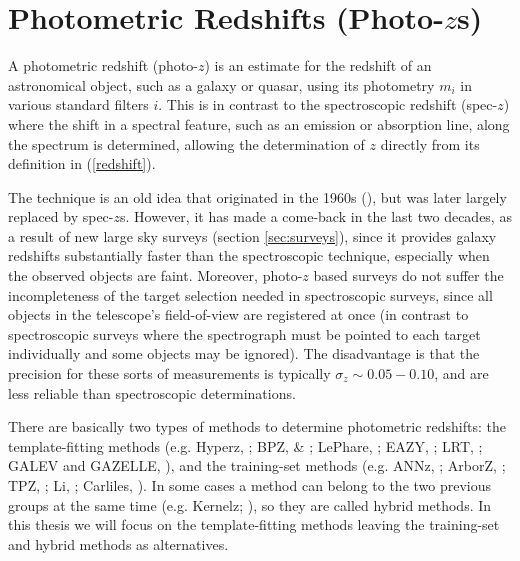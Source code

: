 \section{Photometric Redshifts (Photo-$z$s)}
\label{sec:theo_photoz}

A photometric redshift (photo-$z$) is an estimate for the redshift of an astronomical object, such as a galaxy or quasar, using its photometry $m_i$ in various standard filters $i$. This is in contrast to the spectroscopic redshift (spec-$z$) where the shift in a spectral feature, such as an emission or absorption line, along the spectrum is determined, allowing the determination of $z$ directly from its definition in (\ref{redshift}). 

The technique is an old idea that originated in the 1960s (\citet{Baum1962, Puschell1982, Koo1985, Loh1986, Connolly1995}), but was later largely replaced by spec-$z$s. However, it has made a come-back in the last two decades, as a result of new large sky surveys (section \ref{sec:surveys}), since it provides galaxy redshifts substantially faster than the spectroscopic technique, especially when the observed objects are faint. Moreover, photo-$z$ based surveys do not suffer the incompleteness of the target selection needed in spectroscopic surveys, since all objects in the telescope's field-of-view are registered at once (in contrast to spectroscopic surveys where the spectrograph must be pointed to each target individually and some objects may be ignored). The disadvantage is that the precision for these sorts of measurements is typically $\sigma_z \sim 0.05-0.10$, and are less reliable than spectroscopic determinations.  

There are basically two types of methods to determine photometric redshifts: the template-fitting methods (e.g. Hyperz, \citet{Bolzonella2000}; BPZ, \citet{Benitez2000} \& \citet{Coe2006}; LePhare, \citet{Ilbert2006}; EAZY, \citet{Brammer2008}; LRT, \citet{Assef2008}; GALEV and GAZELLE, \citet{Kotulla2008}), and the training-set methods (e.g. ANNz, \citet{Collister2004}; ArborZ, \citet{Gerdes2010}; TPZ, \citet{CarrascoKind2013};  Li, \citet{Li2008}; Carliles, \citet{Carliles2010}). In some cases a method can belong to the two previous groups at the same time (e.g. Kernelz; \citet{Wolf2014}), so they are called hybrid methods. In this thesis we will focus on the template-fitting methods leaving the training-set and hybrid methods as alternatives. 


